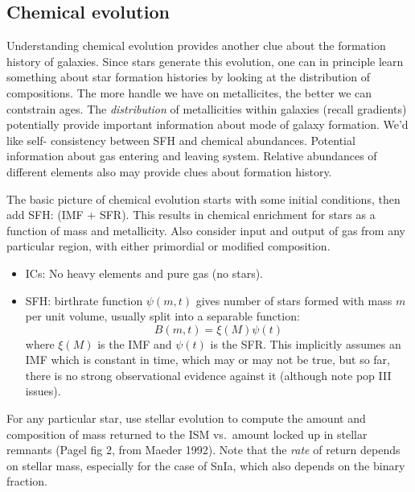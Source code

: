 \documentclass{article}
\begin{document}
\subsection{Chemical evolution}
Understanding chemical evolution provides another clue about
the formation history of galaxies. Since stars generate this evolution,
one can in principle learn something about star formation histories by
looking at the distribution of compositions. The more handle we have on
metallicites, the better we can contstrain ages. The \emph{distribution}
of metallicities within galaxies (recall gradients) potentially provide
important information about mode of galaxy formation. We'd like self-
consistency between SFH  and chemical abundances. Potential information
about gas entering and leaving system. Relative abundances of different
elements also may provide clues about formation history.

The basic picture of chemical evolution starts with some initial conditions,
then add SFH: (IMF + SFR). This results in chemical enrichment for stars as a
function of mass and metallicity. Also consider input and output of gas from
any particular region, with either primordial or modified composition.
\begin{itemize}
    \item ICs: No heavy elements and pure gas (no stars).
    \item SFH: birthrate function $\psi(m,t)$ gives number of stars formed with
        mass $m$ per unit volume, usually split into a separable function:
        \[
            B(m,t) = \xi(M)\psi(t)
        \]
        where $\xi(M)$ is the IMF and $\psi(t)$ is the SFR\@.  This implicitly
        assumes an IMF which is constant in time, which may or may not be true,
        but so far, there is no strong observational evidence against it
        (although note pop III issues).
\end{itemize}
For any particular star, use stellar evolution to compute the amount and
composition of mass returned to the ISM vs.\ amount locked up in stellar
remnants (Pagel fig 2, from Maeder 1992).  Note that the \emph{rate} of return
depends on stellar mass, especially for the case of SnIa, which also depends on
the binary fraction.
\end{document}
